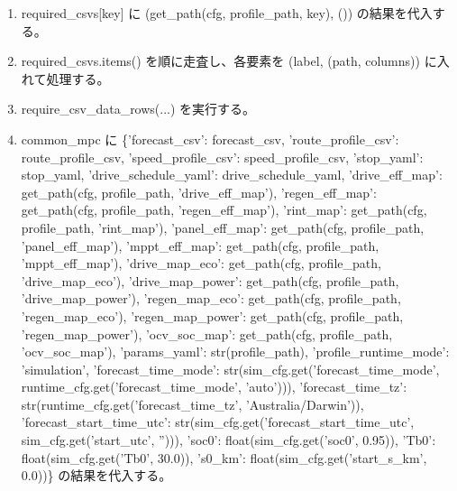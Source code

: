\documentclass[a4paper,11pt]{article}
\begin{document}
\begin{enumerate}[leftmargin=1.8em]
\item   required\_csvs[key] に (get\_path(cfg, profile\_path, key), ()) の結果を代入する。
\item required\_csvs.items() を順に走査し、各要素を (label, (path, columns)) に入れて処理する。
\item   require\_csv\_data\_rows(...) を実行する。
\item common\_mpc に \{'forecast\_csv': forecast\_csv, 'route\_profile\_csv': route\_profile\_csv, 'speed\_profile\_csv': speed\_profile\_csv, 'stop\_yaml': stop\_yaml, 'drive\_schedule\_yaml': drive\_schedule\_yaml, 'drive\_eff\_map': get\_path(cfg, profile\_path, 'drive\_eff\_map'), 'regen\_eff\_map': get\_path(cfg, profile\_path, 'regen\_eff\_map'), 'rint\_map': get\_path(cfg, profile\_path, 'rint\_map'), 'panel\_eff\_map': get\_path(cfg, profile\_path, 'panel\_eff\_map'), 'mppt\_eff\_map': get\_path(cfg, profile\_path, 'mppt\_eff\_map'), 'drive\_map\_eco': get\_path(cfg, profile\_path, 'drive\_map\_eco'), 'drive\_map\_power': get\_path(cfg, profile\_path, 'drive\_map\_power'), 'regen\_map\_eco': get\_path(cfg, profile\_path, 'regen\_map\_eco'), 'regen\_map\_power': get\_path(cfg, profile\_path, 'regen\_map\_power'), 'ocv\_soc\_map': get\_path(cfg, profile\_path, 'ocv\_soc\_map'), 'params\_yaml': str(profile\_path), 'profile\_runtime\_mode': 'simulation', 'forecast\_time\_mode': str(sim\_cfg.get('forecast\_time\_mode', runtime\_cfg.get('forecast\_time\_mode', 'auto'))), 'forecast\_time\_tz': str(runtime\_cfg.get('forecast\_time\_tz', 'Australia/Darwin')), 'forecast\_start\_time\_utc': str(sim\_cfg.get('forecast\_start\_time\_utc', sim\_cfg.get('start\_utc', ''))), 'soc0': float(sim\_cfg.get('soc0', 0.95)), 'Tb0': float(sim\_cfg.get('Tb0', 30.0)), 's0\_km': float(sim\_cfg.get('start\_s\_km', 0.0))\} の結果を代入する。

\end{enumerate}
\end{document}
